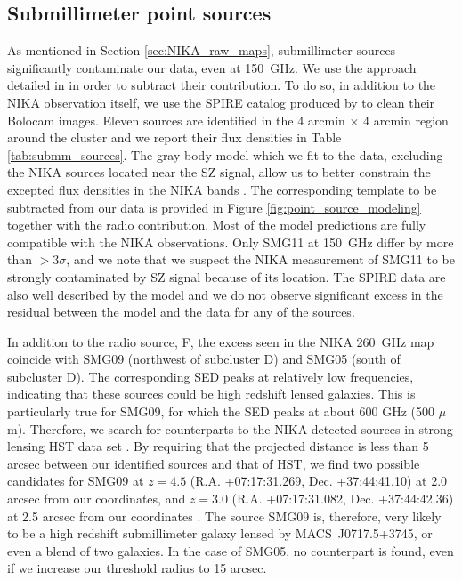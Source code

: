 \documentclass[twocolumn,traditabstract]{aa}
\begin{document}
\subsection{Submillimeter point sources}\label{sec:Submillimeter_point_sources}
As mentioned in Section \ref{sec:NIKA_raw_maps}, submillimeter sources significantly contaminate our data, even at 150~GHz. We use the approach detailed in \cite{Adam2016} in order to subtract their contribution. To do so, in addition to the NIKA observation itself, we use the SPIRE \citep[Spectral and Photometric Imaging REceiver,][]{Griffin2010} catalog produced by \cite{Sayers2013} to clean their Bolocam images. Eleven sources are identified in the 4 arcmin $\times$ 4 arcmin region around the cluster and we report their flux densities in Table \ref{tab:submm_sources}. The gray body model which we fit to the data, excluding the NIKA sources located near the SZ signal, allow us to better constrain the excepted flux densities in the NIKA bands \citep[see][for more details]{Adam2016}. The corresponding template to be subtracted from our data is provided in Figure \ref{fig:point_source_modeling} together with the radio contribution. Most of the model predictions are fully compatible with the NIKA observations. Only SMG11 at 150~GHz differ by more than $>3 \sigma$, and we note that we suspect the NIKA measurement of SMG11 to be strongly contaminated by SZ signal because of its location. The SPIRE data are also well described by the model and we do not observe significant excess in the residual between the model and the data for any of the sources.

In addition to the radio source, F, the excess seen in the NIKA 260~GHz map coincide with SMG09 (northwest of subcluster D) and SMG05 (south of subcluster D). The corresponding SED peaks at relatively low frequencies, indicating that these sources could be high redshift lensed galaxies. This is particularly true for SMG09, for which the SED peaks at about 600 GHz (500 $\mu$m). Therefore, we search for counterparts to the NIKA detected sources in strong lensing HST data set \citep[Hubble Space Telecope, Frontier Field campaign, see][]{Diego2015}. By requiring that the projected distance is less than 5 arcsec between our identified sources and that of HST, we find two possible candidates for SMG09 at $z=4.5$ (R.A. +07:17:31.269, Dec. +37:44:41.10) at 2.0 arcsec from our coordinates, and $z=3.0$ (R.A. +07:17:31.082, Dec. +37:44:42.36) at 2.5 arcsec from our coordinates \citep[ID25.1 and ID62.1, respectively,][]{Diego2015}. The source SMG09 is, therefore, very likely to be a high redshift submillimeter galaxy lensed by \mbox{MACS~J0717.5+3745}, or even a blend of two galaxies. In the case of SMG05, no counterpart is found, even if we increase our threshold radius to 15 arcsec.
\end{document}
